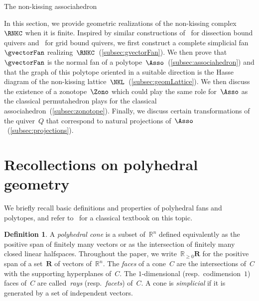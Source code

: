 \documentclass{amsart}
\makeatletter
\theoremstyle{definition}
\newtheorem{definition}[theorem]{Definition}
\newcommand{\R}{\mathbb{R}} %
\renewcommand{\b}[1]{\mathbf{#1}} %
\newcommand{\darkblue}{\color{darkblue}} %
\newcommand{\defn}[1]{\textsl{\darkblue #1}} %
\def\part{\@startsection{part}{1}%
\z@{.7\linespacing\@plus\linespacing}{.8\linespacing}%
{\LARGE\sffamily\centering}}
\makeatother
\begin{document}

\newpage
\part{The non-kissing associahedron}
\label{part:geometry}

In this section, we provide geometric realizations of the non-kissing complex~$\RNKC$ when it is finite.
Inspired by similar constructions of~\cite{MannevillePilaud-accordion} for dissection bound quivers and~\cite{GarverMcConville} for grid bound quivers, we first construct a complete simplicial fan~$\gvectorFan$ realizing~$\RNKC$~(\ref{subsec:gvectorFan}).
We then prove that~$\gvectorFan$ is the normal fan of a polytope~$\Asso$~(\ref{subsec:associahedron}) and that the graph of this polytope oriented in a suitable direction is the Hasse diagram of the non-kissing lattice~$\NKL$~(\ref{subsec:geomLattice}).
We then discuss the existence of a zonotope~$\Zono$ which could play the same role for~$\Asso$ as the classical permutahedron plays for the classical associahedron~(\ref{subsec:zonotope}).
Finally, we discuss certain transformations of the quiver~$Q$ that correspond to natural projections of~$\Asso$~(\ref{subsec:projections}).


\section{Recollections on polyhedral geometry}
\label{sec:polyhedralGeometry}

We briefly recall basic definitions and properties of polyhedral fans and polytopes, and refer to~\cite{Ziegler-polytopes} for a classical textbook on this topic.

\begin{definition}
A \defn{polyhedral cone} is a subset of~$\R^n$ defined equivalently as the positive span of finitely many vectors or as the intersection of finitely many closed linear halfspaces.
Throughout the paper, we write~$\R_{\ge0}\b{R}$ for the positive span of a set~$\b{R}$ of vectors of~$\R^n$.
The \defn{faces} of a cone~$C$ are the intersections of~$C$ with the supporting hyperplanes of~$C$.
The $1$-dimensional (resp.~codimension~$1$) faces of~$C$ are called~\defn{rays} (resp.~\defn{facets}) of~$C$.
A cone is \defn{simplicial} if it is generated by a set of independent vectors.
\end{definition}
\end{document}
